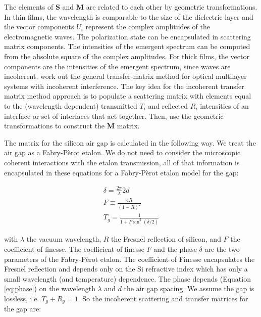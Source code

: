 \documentclass[osajnl,preprint,showpacs,superscriptaddress,12pt]{revtex4-1} %
\begin{document}
The elements of $\boldsymbol{S}$ and $\boldsymbol{M}$ are related to each other by geometric transformations\cite{2007fuph.book.....S}.  In thin films, the wavelength is comparable to the size of the dielectric layer and the vector components $U_{i}$ represent the complex amplitudes of the electromagnetic waves.  The polarization state can be encapsulated in scattering matrix components\cite{2007fuph.book.....S}.  The intensities of the emergent spectrum can be computed from the absolute square of the complex amplitudes.  For thick films, the vector components are the intensities of the emergent spectrum, since waves are incoherent.  \cite{2002ApOpt..41.3978K} work out the general transfer-matrix method for optical multilayer systems with incoherent interference.  The key idea for the incoherent transfer matrix method approach is to populate a scattering matrix with elements equal to the (wavelength dependent) transmitted $T_i$ and reflected $R_i$ intensities of an interface or set of interfaces that act together.  Then, use the geometric transformations to construct the $\boldsymbol{M}$ matrix.

The matrix for the silicon air gap is calculated in the following way.  We treat the air gap as a Fabry-P\`erot etalon.  We do not need to consider the microscopic coherent interactions with the etalon transmission, all of that information is encapsulated in these equations for a Fabry-P\`erot etalon model for the gap:

\begin{eqnarray}
 \delta = \frac{2\pi}{\lambda}2d \label{eq:phase} \\
  F \equiv \frac{4R}{(1-R)^2} \\
 T_g = \frac{1}{1+F\sin^2(\delta/2)}  \label{eq:FabPerot}
\end{eqnarray}

with $\lambda$ the vacuum wavelength, $R$ the Fresnel reflection of silicon, and $F$ the coefficient of finesse.  The coefficient of finesse $F$ and the phase $\delta$ are the two parameters of the Fabry-P\`erot etalon.  The coefficient of Finesse encapsulates the Fresnel reflection and depends only on the Si refractive index which has only a small wavelength (and temperature) dependence.  The phase depends (Equation \ref{eq:phase}) on the wavelength $\lambda$ and $d$ the air gap spacing.  We assume the gap is lossless, i.e. $T_g+R_g=1$.  So the incoherent scattering and transfer matrices for the gap are:
\end{document}
